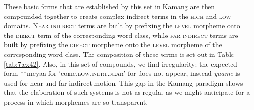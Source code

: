 \documentclass[output=paper]{LSP/langsci}
\begin{document}
These basic forms that are established by this set in Kamang are then compounded together to create complex indirect terms in the \textsc{high} and \textsc{low} domains. N\textsc{ear} \textsc{indirect} terms are built by prefixing the \textsc{level} morpheme onto the \textsc{direct} term of the corresponding word class, while \textsc{far} \textsc{indirect} terms are built by prefixing the \textsc{direct} morpheme onto the \textsc{level} morpheme of the corresponding word class. The composition of these terms is set out in Table \ref{tab:7:ex42}. Also, in this set of compounds, we find irregularity: the expected form **meyaa{\ng} for `come.\textsc{low.indrt.near}' for does not appear, instead \textit{yaa{\ng}me} is used for near and far indirect motion. This gap in the Kamang paradigm shows that the elaboration of such systems is not as regular as we might anticipate for a process in which morphemes are so transparent. 
\end{document}
